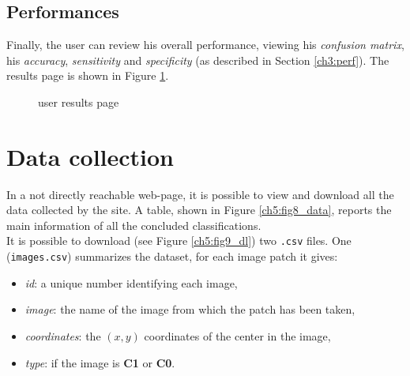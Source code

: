 \vspace{0.5cm}

\subsection{Performances}

Finally, the user can review his overall performance, viewing his \textit{confusion matrix}, his \textit{accuracy}, \textit{sensitivity} and \textit{specificity} (as described in Section \ref{ch3:perf}).
The results page is shown in Figure \ref{ch5:fig7_res}.

\begin{figure}[!hbt]
  \centering
  \caption{user results page}
  \label{ch5:fig7_res}
\end{figure}  

\vspace{0.5cm}


\section{Data collection}

In a not directly reachable web-page, it is possible to view and download all the data collected by the site. A table, shown in Figure \ref{ch5:fig8_data},
reports the main information of all the concluded classifications.\\
It is possible to download (see Figure \ref{ch5:fig9_dl}) two \texttt{.csv} files. One (\texttt{images.csv}) summarizes the dataset, for each image patch it gives:
\begin{itemize}
 \item \textit{id}: a unique number identifying each image,
 \item \textit{image}: the name of the image from which the patch has been taken,
 \item \textit{coordinates}: the $(x,y)$ coordinates of the center in the image,
 \item \textit{type}: if the image is \textbf{C1} or \textbf{C0}.
\end{itemize}

